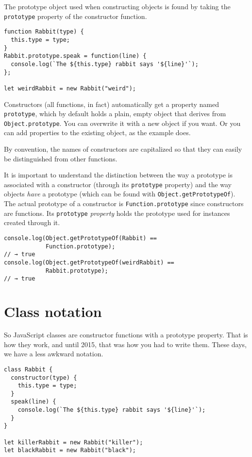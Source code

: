 The prototype object used when constructing objects is found by taking the \lstinline`prototype` property of the constructor function.

\begin{lstlisting}
function Rabbit(type) {
  this.type = type;
}
Rabbit.prototype.speak = function(line) {
  console.log(`The ${this.type} rabbit says '${line}'`);
};

let weirdRabbit = new Rabbit("weird");
\end{lstlisting}
\noindent{}

Constructors (all functions, in fact) automatically get a property named \lstinline`prototype`, which by default holds a plain, empty object that derives from \lstinline`Object.prototype`. You can overwrite it with a new object if you want. Or you can add properties to the existing object, as the example does.

By convention, the names of constructors are capitalized so that they can easily be distinguished from other functions.

It is important to understand the distinction between the way a prototype is associated with a constructor (through its \lstinline`prototype` property) and the way objects \emph{have} a prototype (which can be found with \lstinline`Object.getPrototypeOf`). The actual prototype of a constructor is \lstinline`Function.prototype` since constructors are functions. Its \lstinline`prototype` \emph{property} holds the prototype used for instances created through it.

\begin{lstlisting}
console.log(Object.getPrototypeOf(Rabbit) ==
            Function.prototype);
// → true
console.log(Object.getPrototypeOf(weirdRabbit) ==
            Rabbit.prototype);
// → true
\end{lstlisting}
\noindent

\section{Class notation}

So JavaScript classes are constructor functions with a prototype property. That is how they work, and until 2015, that was how you had to write them. These days, we have a less awkward notation.

\begin{lstlisting}
class Rabbit {
  constructor(type) {
    this.type = type;
  }
  speak(line) {
    console.log(`The ${this.type} rabbit says '${line}'`);
  }
}

let killerRabbit = new Rabbit("killer");
let blackRabbit = new Rabbit("black");
\end{lstlisting}
\noindent{}

